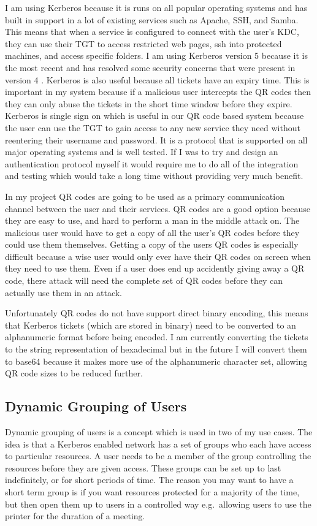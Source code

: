 \documentclass[]{report}   %
\begin{document}
I am using Kerberos because it is runs on all popular operating systems and has built in support in a lot of existing services such as Apache, SSH, and Samba. This means that when a service is configured to connect with the user's KDC, they can use their TGT to access restricted web pages, ssh into protected machines, and access specific folders. I am using Kerberos version 5 because it is the most recent and has resolved some security concerns that were present in version 4 \cite{KerbUpdate}. Kerberos is also useful because all tickets have an expiry time. This is important in my system because if a malicious user intercepts the QR codes then they can only abuse the tickets in the short time window before they expire. Kerberos is single sign on which is useful in our QR code based system because the user can use the TGT to gain access to any new service they need without reentering their username and password. It is a protocol that is supported on all major operating systems and is well tested. If I was to try and design an authentication protocol myself it would require me to do all of the integration and testing which would take a long time without providing very much benefit.

In my project QR codes are going to be used as a primary communication channel between the user and their services. QR codes are a good option because they are easy to use, and hard to perform a man in the middle attack on. The malicious user would have to get a copy of all the user's QR codes before they could use them themselves. Getting a copy of the users QR codes is especially difficult because a wise user would only ever have their QR codes on screen when they need to use them. Even if a user does end up accidently giving away a QR code, there attack will need the complete set of QR codes before they can actually use them in an attack.

Unfortunately QR codes do not have support direct binary encoding, this means that Kerberos tickets (which are stored in binary) need to be converted to an alphanumeric format before being encoded. I am currently converting the tickets to the string representation of hexadecimal but in the future I will convert them to base64 because it makes more use of the alphanumeric character set, allowing QR code sizes to be reduced further.

\subsection{Dynamic Grouping of Users}
Dynamic grouping of users is a concept which is used in two of my use cases. The idea is that a Kerberos enabled network has a set of groups who each have access to particular resources. A user needs to be a member of the group controlling the resources before they are given access. These groups can be set up to last indefinitely, or for short periods of time. The reason you may want to have a short term group is if you want resources protected for a majority of the time, but then open them up to users in a controlled way e.g.\ allowing users to use the printer for the duration of a meeting.
\end{document}
